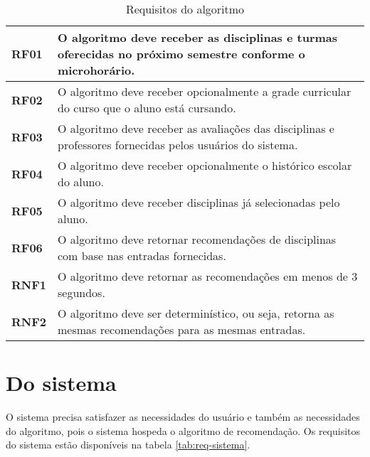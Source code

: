 \begin{table}[!ht]
    \begin{center}
        \begin{tabular}{ | m{} | p{} | }  
            \hline
            \textbf{RF01} & O algoritmo deve receber as disciplinas e turmas oferecidas no próximo semestre conforme o microhorário.\tabularnewline\hline
            \textbf{RF02} & O algoritmo deve receber opcionalmente a grade curricular do curso que o aluno está cursando.\tabularnewline\hline
            \textbf{RF03} & O algoritmo deve receber as avaliações das disciplinas e professores fornecidas pelos usuários do sistema.\tabularnewline\hline
            \textbf{RF04} & O algoritmo deve receber opcionalmente o histórico escolar do aluno.\tabularnewline\hline
            \textbf{RF05} & O algoritmo deve receber disciplinas já selecionadas pelo aluno.\tabularnewline\hline
            \textbf{RF06} & O algoritmo deve retornar recomendações de disciplinas com base nas entradas fornecidas.\tabularnewline\hline
            
            \textbf{RNF1} & O algoritmo deve retornar as recomendações em menos de 3 segundos.\tabularnewline\hline
            \textbf{RNF2} & O algoritmo deve ser determinístico, ou seja, retorna as mesmas recomendações para as mesmas entradas.\tabularnewline\hline
        \end{tabular}
    \end{center}
    \caption{Requisitos do algoritmo}
    
    \label{tab:req-algoritmo}
\end{table}

\section{Do sistema}

O sistema precisa satisfazer as necessidades do usuário e também as necessidades do algoritmo, pois o sistema hospeda o algoritmo de recomendação.
Os requisitos do sistema estão disponíveis na tabela \ref{tab:req-sistema}.

